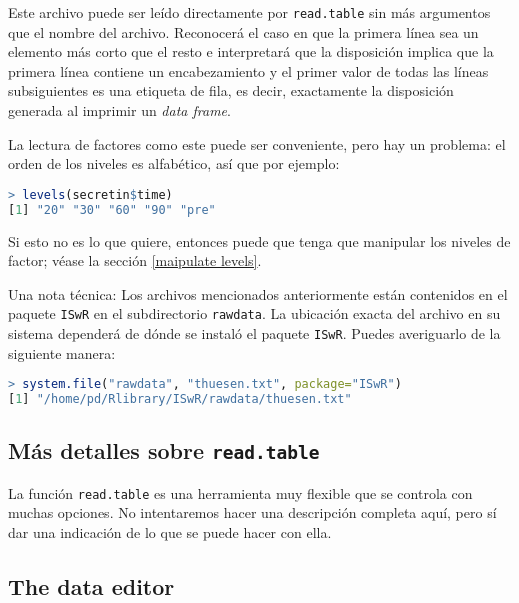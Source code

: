Este archivo puede ser leído directamente por \texttt{read.table} sin más argumentos que
el nombre del archivo. Reconocerá el caso en que la primera línea sea un
elemento más corto que el resto e interpretará que la disposición implica que la
primera línea contiene un encabezamiento y el primer valor de todas las líneas
subsiguientes es una etiqueta de fila, es decir, exactamente la disposición
generada al imprimir un \textit{data frame}.

La lectura de factores como este puede ser conveniente, pero hay un
problema: el orden de los niveles es alfabético, así que por ejemplo:

\begin{lstlisting}[language=R]
> levels(secretin$time)
[1] "20" "30" "60" "90" "pre"
\end{lstlisting}

Si esto no es lo que quiere, entonces puede que tenga que manipular los niveles
de factor; véase la sección \ref{maipulate levels}.

Una nota técnica: Los archivos mencionados anteriormente están contenidos en el
paquete \texttt{ISwR} en el subdirectorio \texttt{rawdata}. La ubicación exacta
del archivo en su sistema dependerá de dónde se instaló el paquete
\texttt{ISwR}. Puedes averiguarlo de la siguiente manera:

\begin{lstlisting}[language=R]
> system.file("rawdata", "thuesen.txt", package="ISwR")
[1] "/home/pd/Rlibrary/ISwR/rawdata/thuesen.txt"
\end{lstlisting}

\subsection{Más detalles sobre \texttt{read.table}}

La función \texttt{read.table} es una herramienta muy flexible que se controla
con muchas opciones. No intentaremos hacer una descripción completa aquí, pero
sí dar una indicación de lo que se puede hacer con ella.

\subsection{The data editor}

